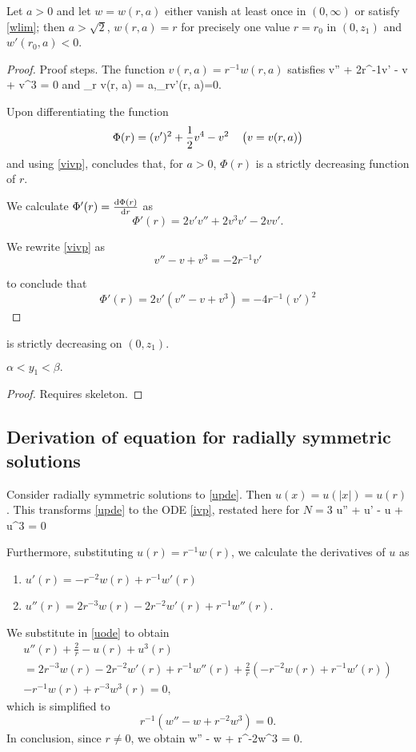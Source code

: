 \begin{lemma}
Let $a>0$ and let $w=w(r,a)$ either vanish at least once in $(0, \infty)$
    or satisfy \eqref{wlim}; then $a>\sqrt{2}$, $w(r, a)=r$ for precisely one value
$r=r_0$ in $(0, z_1)$ and $w'(r_0, a)<0$.
\end{lemma}
\begin{proof}
{\red Proof steps.} The function $v(r, a)=r^{-1}w(r, a)$ satisfies
\be\label{vivp} v'' + 2r^{-1}v' - v + v^3 = 0\ee
and
\be\label{vic} \lim_{r} v(r, a) = a,\quad \lim_{r}v'(r, a)=0.\ee

Upon differentiating the function
$$\Phi(r) = (v')^2 + \frac{1}{2} v^4 - v^2\quad\left(v=v(r, a)\right)$$
and using \eqref{vivp}, \cite{coffm} concludes that, for $a>0$, $\Phi(r)$ is a
strictly decreasing function of $r$. 

We calculate $\Phi'(r)=\frac{\mathop{}\!\mathrm{d}\Phi(r)}{\mathop{}\!\mathrm{d} r}$ as
$$\Phi'(r) = 2v'v'' + 2v^3v' - 2vv'.$$

We rewrite \eqref{vivp} as
$$v'' - v + v^3 = -2r^{-1}v'$$

to conclude that 
$$\Phi'(r) = 2v'\left(v'' - v + v^3\right)=-4r^{-1}(v')^2$$
\end{proof}

is strictly decreasing {\red on $(0, z_1)$}.

\begin{lemma}
    $\alpha < y_1 < \beta.$
\end{lemma}
\begin{proof}
{\red Requires skeleton.}
\end{proof}


\subsection{Derivation of equation for radially symmetric solutions}\label{weqv}
Consider radially symmetric solutions to \eqref{upde}. Then $u(x) = u(|x|) =
u(r)$ . This transforms \eqref{upde} to the ODE \eqref{ivp}, restated here for
$N=3$
\be \label{uode} u'' +  u' - u + u^3 = 0 \ee 

Furthermore, substituting $u(r) = r^{-1}w(r)$, we calculate the derivatives of
$u$ as
\begin{enumerate}
    \item $u'(r) = -r^{-2}w(r) + r^{-1}w'(r)$
    \item $u''(r) = 2r^{-3}w(r) - 2r^{-2}w'(r) + r^{-1}w''(r)$.
\end{enumerate}
We substitute in \eqref{uode} to obtain
\begin{multline} 
u''(r) + \frac{2}{r} - u(r) + u^3(r) \\
= 2r^{-3}w(r) - 2r^{-2}w'(r) + r^{-1}w''(r)
+ \frac{2}{r}\left(-r^{-2}w(r) + r^{-1}w'(r)\right) \\
- r^{-1}w(r) + r^{-3}w^3(r) = 0,
\end{multline}
which is simplified to
$$ r^{-1}\left(w'' - w + r^{-2}w^3 \right) = 0. $$
In conclusion, since $r\neq 0$, we obtain
\be \label{wode} w'' - w + r^{-2}w^3 = 0. \ee

